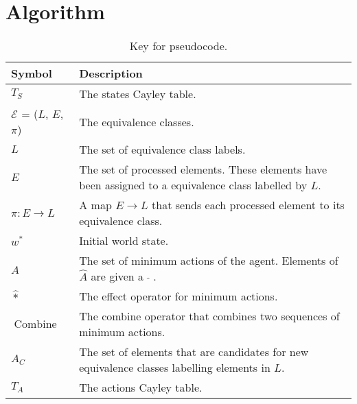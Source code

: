\chapter{Algorithm
}
\begin{table*}
	\centering
	\begin{tabularx}{\textwidth}{@{}lX@{}}
		\toprule
		\textbf{Symbol}                         & \textbf{Description}                                                                                     \\
		\midrule
		$T_{S}$                                 & The states Cayley table.                                                                                 \\
		$\mathcal{E}$ = ($L$, \; $E$, \; $\pi$) & The equivalence classes.                                                                                 \\
		$L$                                     & The set of equivalence class labels.                                                                     \\
		$E$                                     & The set of processed elements. These elements have been assigned to a equivalence class labelled by $L$. \\
		$\pi: E \to L$                          & A map $E \to L$ that sends each processed element to its equivalence class.                              \\
		$w^{*}$                                 & Initial world state.                                                                                     \\
		$\hat{A}$                               & The set of minimum actions of the agent. Elements of $\hat{A}$ are given a $\; \hat{ } \;$.              \\
		$\hat{*}$                               & The effect operator for minimum actions.                                                                 \\
		$\operatorname{Combine}$                & The combine operator that combines two sequences of minimum actions.                                     \\
		$A_{C}$                                 & The set of elements that are candidates for new equivalence classes labelling elements in $L$.           \\
		$T_{A}$                                 & The actions Cayley table.                                                                                \\
		\bottomrule
	\end{tabularx}
	\caption{Key for pseudocode.}
	\label{tab:pseudocode_key}
\end{table*}



